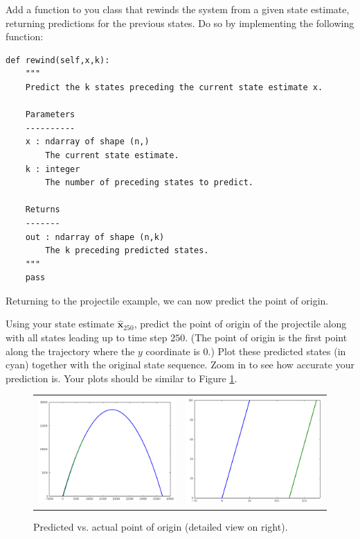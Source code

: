 \begin{problem}
Add a function to you class that rewinds the system from a given state estimate, returning predictions for the previous states.
Do so by implementing the following function:
\begin{lstlisting}
def rewind(self,x,k):
    """
    Predict the k states preceding the current state estimate x.
         
    Parameters
    ----------
    x : ndarray of shape (n,)
        The current state estimate.
    k : integer
        The number of preceding states to predict.

    Returns
    -------
    out : ndarray of shape (n,k)
        The k preceding predicted states.
    """    
    pass
\end{lstlisting}
\end{problem}

Returning to the projectile example, we can now predict the point of origin.

\begin{problem}
Using your state estimate $\widehat{\mathbf{x}}_{250}$, predict the point of origin of the projectile along with 
all states leading up to time step $250$.
(The point of origin is the first point along the trajectory where the $y$ coordinate is $0$.)
Plot these predicted states (in cyan) together with the original state sequence.
Zoom in to see how accurate your prediction is.
Your plots should be similar to Figure \ref{fig:origin}.
\label{prob:origin_pt}
\end{problem}

\begin{figure}
	\centering
	\begin{tabular}{cc}
	\includegraphics[width=.45\textwidth]{origin_macro} &
	\includegraphics[width=.45\textwidth]{origin_micro}
	\end{tabular}
	\caption{Predicted vs. actual point of origin (detailed view on right).}
	\label{fig:origin}
\end{figure} 
